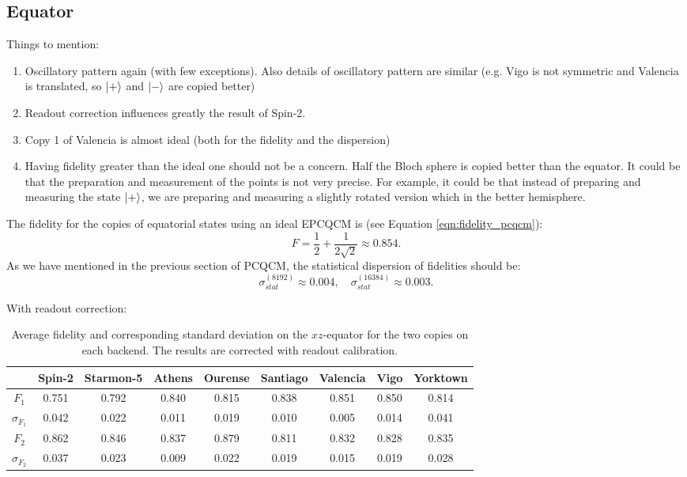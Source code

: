\subsection{Equator}
Things to mention:
\begin{enumerate}
  \item Oscillatory pattern again (with few exceptions). Also details of oscillatory pattern are similar (e.g. Vigo is not symmetric and Valencia is translated, so $\ket{+}$ and $\ket{-}$ are copied better)
  \item Readout correction influences greatly the result of Spin-2. 
  \item Copy 1 of Valencia is almost ideal (both for the fidelity and the dispersion)
  \item Having fidelity greater than the ideal one should not be a concern. Half the Bloch sphere is copied better than the equator. 
  It could be that the preparation and measurement of the points is not very precise. For example, it could be that instead of preparing and measuring the state $\ket{+}$, we are preparing and measuring a slightly rotated version which in the better hemisphere.
\end{enumerate} 

The fidelity for the copies of equatorial states using an ideal EPCQCM is (see Equation \ref{eqn:fidelity_pcqcm}):
\[
  F=\frac{1}{2}+\frac{1}{2\sqrt{2}}\approx0.854.
\]
As we have mentioned in the previous section of PCQCM, the statistical dispersion of fidelities should be: 
\[
    \sigma_{stat}^{(8192)}\approx 0.004, \quad \sigma_{stat}^{(16384)}\approx 0.003.
\]

With readout correction:
\begin{table}[H]
    \centering
    \begin{tabular}{|c|c|c|c|c|c|c|c|c|}
    \hline
    \textbf{} & \textbf{Spin-2} & \textbf{Starmon-5} & \textbf{Athens} & \textbf{Ourense} & \textbf{Santiago} & \textbf{Valencia} & \textbf{Vigo} & \textbf{Yorktown} \\ \hline
    $F_1$              & 0.751 & 0.792 & 0.840 & 0.815 & 0.838 & 0.851 & 0.850 & 0.814 \\ \hline
    $\sigma_{F_1}$     & 0.042 & 0.022 & 0.011 & 0.019 & 0.010 & 0.005 & 0.014 & 0.041 \\ \hline
    $F_2$              & 0.862 & 0.846 & 0.837 & 0.879 & 0.811 & 0.832 & 0.828 & 0.835 \\ \hline
    $\sigma_{F_2}$     & 0.037 & 0.023 & 0.009 & 0.022 & 0.019 & 0.015 & 0.019 & 0.028 \\ \hline
    \end{tabular}
    \caption{Average fidelity and corresponding standard deviation on the $xz$-equator for the two copies on each backend. The results are corrected with readout calibration.}
    \label{tab:results_epcqcm_onlyequator_corrected}
\end{table}

